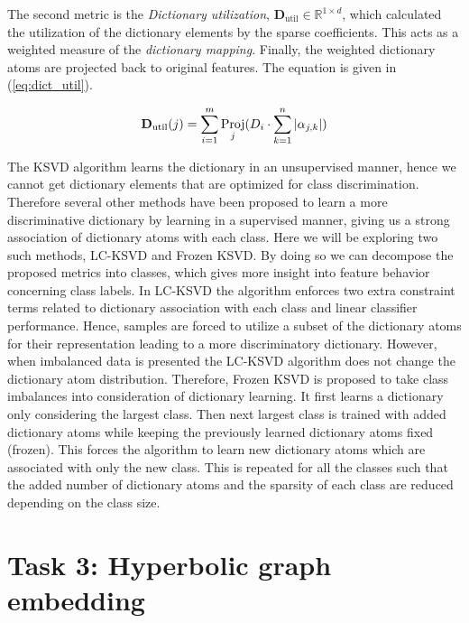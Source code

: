      The second metric is the \textit{Dictionary utilization}, $\mathbf{D}_\textrm{util} \in \mathbb{R}^{1 \times d}$, which calculated the utilization of the dictionary elements by the sparse coefficients. This acts as a weighted measure of the \textit{dictionary mapping}. Finally, the weighted dictionary atoms are projected back to original features. The equation is given in (\ref{eq:dict_util}).
     
     \begin{equation}
        \label{eq:dict_util}
        \mathbf{D}_\textrm{util}(j)= \sum_{i=1}^m \operatorname*{Proj}_j(D_i \cdot \sum_{k=1}^n |\alpha_{j,k}|)  
    \end{equation}
     
    The KSVD algorithm learns the dictionary in an unsupervised manner, hence we cannot get dictionary elements that are optimized for class discrimination. Therefore several other methods have been proposed to learn a more discriminative dictionary by learning in a supervised manner, giving us a strong association of dictionary atoms with each class. Here we will be exploring two such methods, LC-KSVD and Frozen KSVD. By doing so we can decompose the proposed metrics into classes, which gives more insight into feature behavior concerning class labels. In LC-KSVD the algorithm enforces two extra constraint terms related to dictionary association with each class and linear classifier performance. Hence, samples are forced to utilize a subset of the dictionary atoms for their representation leading to a more discriminatory dictionary. However, when imbalanced data is presented the LC-KSVD algorithm does not change the dictionary atom distribution. Therefore, Frozen KSVD is proposed to take class imbalances into consideration of dictionary learning. It first learns a dictionary only considering the largest class. Then next largest class is trained with added dictionary atoms while keeping the previously learned dictionary atoms fixed (frozen). This forces the algorithm to learn new dictionary atoms which are associated with only the new class. This is repeated for all the classes such that the added number of dictionary atoms and the sparsity of each class are reduced depending on the class size. 

\section{Task 3: Hyperbolic graph embedding}